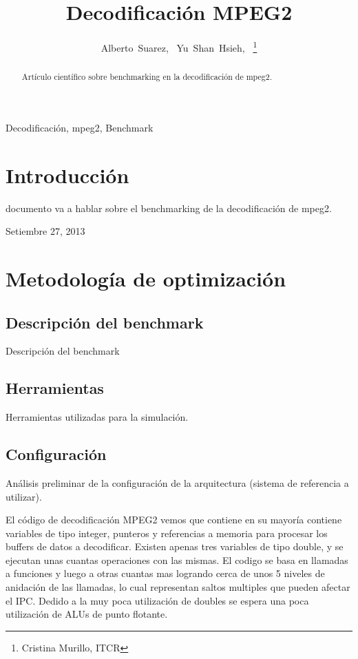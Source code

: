 \documentclass[journal]{IEEEtran}
\begin{document}
%
\title{Decodificaci\'{o}n MPEG2}
\author{Alberto~Suarez,~
        Yu~Shan~Hsieh,~%
\thanks{Cristina Murillo, ITCR}%
}
\maketitle

\begin{abstract}
Art\'{i}culo cient\'{i}fico sobre benchmarking en la decodificaci\'{o}n de mpeg2.
\end{abstract}

\begin{IEEEkeywords}
Decodificaci\'{o}n, mpeg2, Benchmark
\end{IEEEkeywords}

\section{Introducci\'{o}n}
 documento va a hablar sobre el benchmarking de la decodificaci\'{o}n de mpeg2.

\hfill Setiembre 27, 2013

\section{Metodolog\'{i}a de optimizaci\'{o}n}

\subsection{Descripci\'{o}n del benchmark}
Descripci\'{o}n del benchmark

\subsection{Herramientas}
Herramientas utilizadas para la simulaci\'{o}n.

\subsection{Configuraci\'{o}n}
An\'{a}lisis preliminar de la configuraci\'{o}n de la arquitectura (sistema de referencia a utilizar).

El c\'odigo de decodificaci\'on MPEG2 vemos que contiene en su mayor\'ia contiene variables de tipo integer, punteros y referencias a memoria para procesar los buffers de datos a decodificar. Existen apenas tres variables de tipo double, y se ejecutan unas cuantas operaciones con las mismas.  El codigo se basa en llamadas a funciones y luego a otras cuantas mas logrando cerca de unos 5 niveles de anidaci\'on de las llamadas, lo cual representan saltos multiples que pueden afectar el IPC.
Dedido a la muy poca utilizaci\'on de doubles se espera una poca utilizaci\'on de ALUs de punto flotante. \newline
\end{document}
